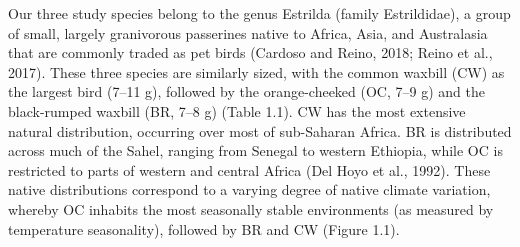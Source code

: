\documentclass[10pt, twoside]{book} %
\begin{document}
Our three study species belong to the genus Estrilda (family Estrildidae), a group of small, largely granivorous passerines native to Africa, Asia, and Australasia that are commonly traded as pet birds (Cardoso and Reino, 2018; Reino et al., 2017). These three species are similarly sized, with the common waxbill (CW) as the largest bird (7–11 g), followed by the orange-cheeked (OC, 7–9 g) and the black-rumped waxbill (BR, 7–8 g) (Table 1.1). CW has the most extensive natural distribution, occurring over most of sub-Saharan Africa. BR is distributed across much of the Sahel, ranging from Senegal to western Ethiopia, while OC is restricted to parts of western and central Africa (Del Hoyo et al., 1992). These native distributions correspond to a varying degree of native climate variation, whereby OC inhabits the most seasonally stable environments (as measured by temperature seasonality), followed by BR and CW (Figure 1.1).

\clearpage
\end{document}
